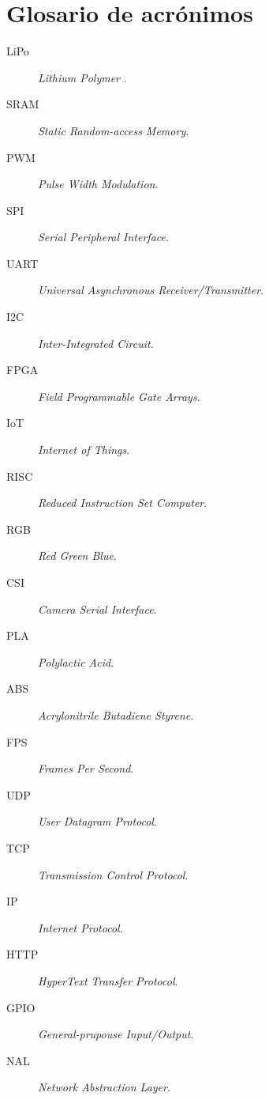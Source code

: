 \chapter{Glosario de acrónimos}
\label{chap:acronimos}


\begin{description}
 \item [LiPo] \emph{Lithium Polymer }.
 \item [SRAM] \emph{Static Random-access Memory}.
 \item [PWM] \emph{Pulse Width Modulation}.
 \item [SPI] \emph{Serial Peripheral Interface}.
 \item [UART] \emph{Universal Asynchronous Receiver/Transmitter}.
 \item [I2C] \emph{Inter-Integrated Circuit}.
 \item [FPGA] \emph{Field Programmable Gate Arrays}.
 \item [IoT] \emph{Internet of Things}.
 \item [RISC] \emph{Reduced Instruction Set Computer}.
 \item [RGB] \emph{Red Green Blue}.
 \item [CSI] \emph{Camera Serial Interface}.
 \item [PLA] \emph{Polylactic Acid}.
 \item [ABS] \emph{Acrylonitrile Butadiene Styrene}.
 \item [FPS] \emph{Frames Per Second}.
 \item [UDP] \emph{User Datagram Protocol}.
 \item [TCP] \emph{Transmission Control Protocol}.
 \item [IP] \emph{Internet Protocol}.
 \item [HTTP] \emph{ HyperText Transfer Protocol}.
 \item [GPIO] \emph{General-prupouse Input/Output}.
 \item [NAL] \emph{Network Abstraction Layer}.

\end{description}

